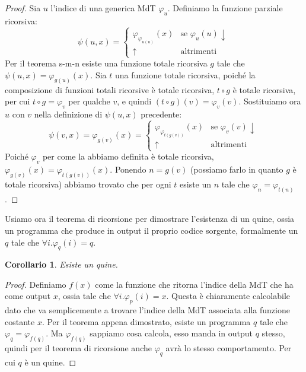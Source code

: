 \documentclass[a4paper,titlepage]{article}
\newtheorem{corollario}{Corollario}[section]
\theoremstyle{definition}
\begin{document}
\begin{proof}
	Sia $u$ l'indice di una generica MdT $\varphi_u$. Definiamo la funzione parziale ricorsiva:
	\[		
		\psi(u,x) =
		\begin{cases}
			\varphi_{\varphi_{u(u)}}(x)	& \text{se }\varphi_u(u)\downarrow\\
			\uparrow						  & \text{altrimenti}
		\end{cases}
	\]
	Per il teorema s-m-n esiste una funzione totale ricorsiva $g$ tale che $\psi(u,x)=\varphi_{g(u)}(x)$. Sia $t$ una funzione totale ricorsiva, poiché la composizione di funzioni totali ricorsive è totale ricorsiva, $t\circ g$ è totale ricorsiva, per cui  $t\circ g = \varphi_v$ per qualche $v$, e quindi $(t\circ g)(v) = \varphi_v(v)$. Sostituiamo ora $u$ con $v$ nella definizione di $\psi(u,x)$ precedente: 
	\[		
		\psi(v, x) = \varphi_{g(v)}(x) = 
		\begin{cases}
			\varphi_{\varphi_{t(g(v))}}(x) & \text{se } \varphi_v(v)\downarrow\\
			\uparrow & \text{altrimenti}
		\end{cases}
	\]
	Poiché $\varphi_v$ per come la abbiamo definita è totale ricorsiva, $\varphi_{g(v)}(x)=\varphi_{t(g(v))}(x)$. Ponendo $n = g(v)$ (possiamo farlo in quanto $g$ è totale ricorsiva) abbiamo trovato che per ogni $t$ esiste un $n$ tale che $\varphi_n=\varphi_{t(n)}$.
\end{proof}

Usiamo ora il teorema di ricorsione per dimostrare l'esistenza di un quine, ossia un programma che produce in output il proprio codice sorgente, formalmente un $q$ tale che $\forall i.\varphi_q(i)=q$. 
\begin{corollario}
	Esiste un quine. 
\end{corollario}
\begin{proof}
	Definiamo $f(x)$ come la funzione che ritorna l'indice della MdT che ha come output $x$, ossia tale che $\forall i.\varphi_p(i) = x$. Questa è chiaramente calcolabile dato che va semplicemente a trovare l'indice della MdT associata alla funzione costante $x$. Per il teorema appena dimostrato, esiste un programma $q$ tale che $\varphi_q=\varphi_{f(q)}$. Ma $\varphi_{f(q)}$ sappiamo cosa calcola, esso manda in output $q$ stesso, quindi per il teorema di ricorsione anche $\varphi_q$ avrà lo stesso comportamento. Per cui $q$ è un quine.
\end{proof}
\end{document}
